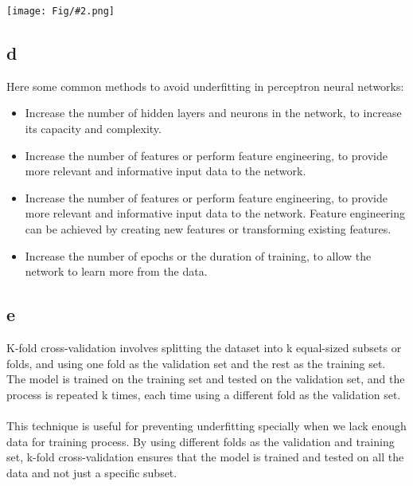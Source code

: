 \documentclass[]{article}
\newcommand{\pict}[2]{\begin{center}
		\texttt{[image: Fig/\#2.png]}
\end{center}}
\begin{document}
	\pict{0.4}{F4}
	
	\subsection*{d}
	Here some common methods to avoid underfitting in perceptron neural networks:
	\begin{itemize}
		\item Increase the number of hidden layers and neurons in the network, to increase its capacity and complexity.
		\item Increase the number of features or perform feature engineering, to provide more relevant and informative input data to the network.
		\item Increase the number of features or perform feature engineering, to provide more relevant and informative input data to the network. Feature engineering can be achieved by creating new features or transforming existing features.
		\item Increase the number of epochs or the duration of training, to allow the network to learn more from the data.
	\end{itemize} 

	\subsection*{e}
	K-fold cross-validation involves splitting the dataset into k equal-sized subsets or folds, and using one fold as the validation set and the rest as the training set. The model is trained on the training set and tested on the validation set, and the process is repeated k times, each time using a different fold as the validation set.\\\\
	This technique is useful for preventing underfitting specially when we lack enough data for training process. By using different folds as the validation and training set, k-fold cross-validation ensures that the model is trained and tested on all the data and not just a specific subset. 
	
\end{document}
